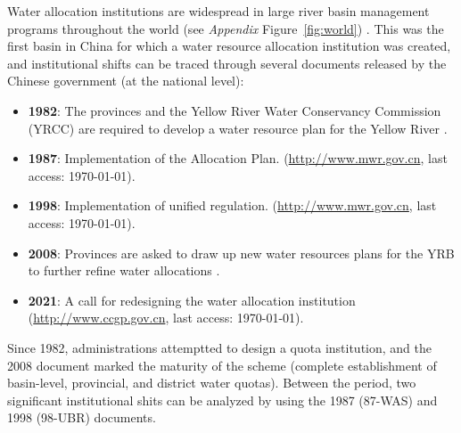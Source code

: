 \documentclass[default, sn-standardnature]{sn-jnl} %
\begin{document}
Water allocation institutions are widespread in large river basin management programs throughout the world (see \textit{Appendix} Figure~\ref{fig:world}) \cite{speed2013}.
This was the first basin in China for which a water resource allocation institution was created, and institutional shifts can be traced through several documents released by the Chinese government (at the national level)\cite{wang2019a}:
\begin{itemize}
    \item \textbf{1982}: The provinces and the Yellow River Water Conservancy Commission (YRCC) are required to develop a water resource plan for the Yellow River \cite{wang2019, wang2019a}.
    \item \textbf{1987}: Implementation of the Allocation Plan. (\href{http://www.gov.cn/zhengce/content/2011-03/30/content_3138.htm#}{http://www.mwr.gov.cn}, last access: \today).
    \item \textbf{1998}: Implementation of unified regulation. (\href{http://www.mwr.gov.cn/ztpd/2013ztbd/2013fxkh/fxkhswcbcs/cs/flfg/201304/t20130411_433489.html}{http://www.mwr.gov.cn}, last access: \today).
    \item \textbf{2008}: Provinces are asked to draw up new water resources plans for the YRB to further refine water allocations \cite{wang2019,wang2019a}.
    \item \textbf{2021}: A call for redesigning the water allocation institution (\href{http://www.ccgp.gov.cn/cggg/zygg/gkzb/202107/t20210721_16591901.htm}{http://www.ccgp.gov.cn}, last access: \today).
\end{itemize}

Since 1982, administrations attemptted to design a quota institution, and the 2008 document marked the maturity of the scheme (complete establishment of basin-level, provincial, and district water quotas).
Between the period, two significant institutional shits can be analyzed by using the 1987 (87-WAS) and 1998 (98-UBR) documents.

\end{document}
